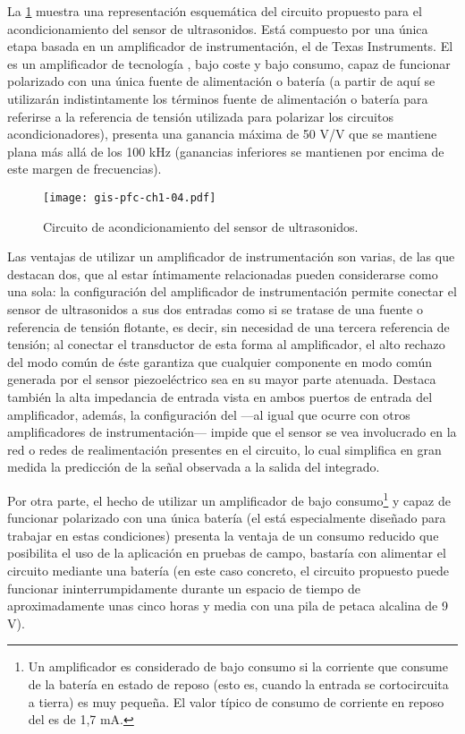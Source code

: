 La \cref{fig:sensor-conditioner} muestra una representación esquemática del
circuito propuesto para el acondicionamiento del sensor de ultrasonidos.
Está compuesto por una única etapa basada en un amplificador de
instrumentación, el  de Texas Instruments. El  es
un amplificador de tecnología , bajo coste y bajo consumo, capaz
de funcionar polarizado con una única fuente de alimentación o batería (a
partir de aquí se utilizarán indistintamente los términos fuente de
alimentación o batería para referirse a la referencia de tensión utilizada
para polarizar los circuitos acondicionadores), presenta una ganancia
máxima de 50 V/V que se mantiene plana más allá de los 100 kHz (ganancias
inferiores se mantienen por encima de este margen de frecuencias).

\begin{figure}
    \begin{center}
	\texttt{[image: gis-pfc-ch1-04.pdf]}
    \end{center}
    \caption[Circuito de acondicionamiento del sensor
    piezoeléctrico]{Circuito de acondicionamiento del sensor de
    ultrasonidos.}
    \label{fig:sensor-conditioner}
\end{figure}

Las ventajas de utilizar un amplificador de instrumentación son varias, de
las que destacan dos, que al estar íntimamente relacionadas pueden
considerarse como una sola: la configuración del amplificador de
instrumentación permite conectar el sensor de ultrasonidos a sus dos
entradas como si se tratase de una fuente o referencia de tensión flotante,
es decir, sin necesidad de una tercera referencia de tensión; al conectar
el transductor de esta forma al amplificador, el alto rechazo del modo
común de éste garantiza que cualquier componente en modo común generada por
el sensor piezoeléctrico sea en su mayor parte atenuada. Destaca también la
alta impedancia de entrada vista en ambos puertos de entrada del
amplificador, además, la configuración del  ---al igual que
ocurre con otros amplificadores de instrumentación--- impide que el sensor
se vea involucrado en la red o redes de realimentación presentes en el
circuito, lo cual simplifica en gran medida la predicción de la señal
observada a la salida del integrado.

Por otra parte, el hecho de utilizar un amplificador de bajo
consumo\footnote{Un amplificador es considerado de bajo consumo si la
corriente que consume de la batería en estado de reposo (esto es, cuando la
entrada se cortocircuita a tierra) es muy pequeña. El valor típico de
consumo de corriente en reposo del  es de 1,7 mA.} y capaz de
funcionar polarizado con una única batería (el  está
especialmente diseñado para trabajar en estas condiciones) presenta la
ventaja de un consumo reducido que posibilita el uso de la aplicación en
pruebas de campo, bastaría con alimentar el circuito mediante una batería
(en este caso concreto, el circuito propuesto puede funcionar
ininterrumpidamente durante un espacio de tiempo de aproximadamente unas
cinco horas y media con una pila de petaca alcalina de 9 V).

